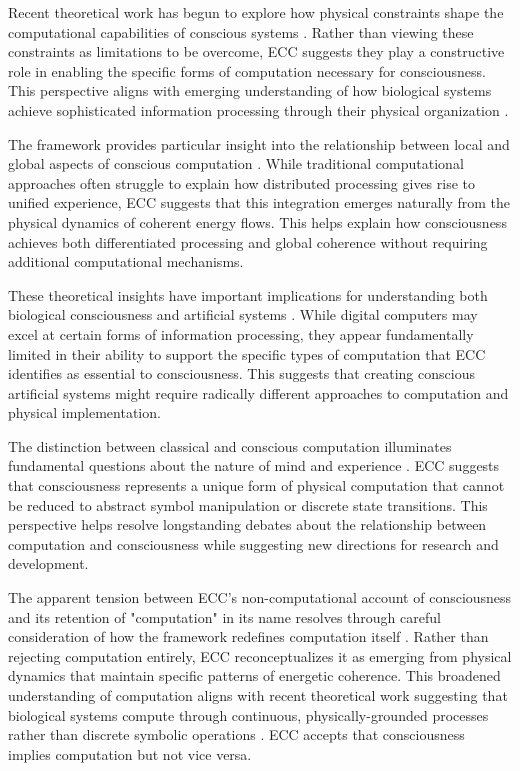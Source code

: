 \begin{refsection}
Recent theoretical work has begun to explore how physical constraints shape the computational capabilities of conscious systems \cite{Fodor1981}. Rather than viewing these constraints as limitations to be overcome, ECC suggests they play a constructive role in enabling the specific forms of computation necessary for consciousness. This perspective aligns with emerging understanding of how biological systems achieve sophisticated information processing through their physical organization \cite{Smith2002}.

The framework provides particular insight into the relationship between local and global aspects of conscious computation \cite{vanGelder1995}. While traditional computational approaches often struggle to explain how distributed processing gives rise to unified experience, ECC suggests that this integration emerges naturally from the physical dynamics of coherent energy flows. This helps explain how consciousness achieves both differentiated processing and global coherence without requiring additional computational mechanisms.

These theoretical insights have important implications for understanding both biological consciousness and artificial systems \cite{Piccinini2015}. While digital computers may excel at certain forms of information processing, they appear fundamentally limited in their ability to support the specific types of computation that ECC identifies as essential to consciousness. This suggests that creating conscious artificial systems might require radically different approaches to computation and physical implementation.

The distinction between classical and conscious computation illuminates fundamental questions about the nature of mind and experience \cite{Chalmers2011}. ECC suggests that consciousness represents a unique form of physical computation that cannot be reduced to abstract symbol manipulation or discrete state transitions. This perspective helps resolve longstanding debates about the relationship between computation and consciousness while suggesting new directions for research and development.

The apparent tension between ECC's non-computational account of consciousness and its retention of "computation" in its name resolves through careful consideration of how the framework redefines computation itself \cite{MacLennan2004}. Rather than rejecting computation entirely, ECC reconceptualizes it as emerging from physical dynamics that maintain specific patterns of energetic coherence. This broadened understanding of computation aligns with recent theoretical work suggesting that biological systems compute through continuous, physically-grounded processes rather than discrete symbolic operations \cite{Siegelmann2003}. ECC accepts that consciousness implies computation but not vice versa.


\end{refsection}
